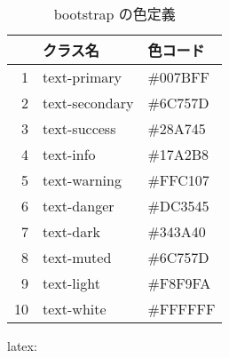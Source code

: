 \documentclass[dvipdfmx,a4j,14pt,uplatex]{jsarticle}
\begin{document}
\begin{table}[htbp]
\caption{\label{tab:org3278755}
bootstrap の色定義}
\centering
\begin{tabular}{rll}
\hline
 & クラス名 & 色コード\\
\hline
1 & text-primary & \#007BFF\\
2 & text-secondary & \#6C757D\\
3 & text-success & \#28A745\\
4 & text-info & \#17A2B8\\
5 & text-warning & \#FFC107\\
6 & text-danger & \#DC3545\\
7 & text-dark & \#343A40\\
8 & text-muted & \#6C757D\\
9 & text-light & \#F8F9FA\\
10 & text-white & \#FFFFFF\\
\hline
\end{tabular}
\end{table}

\begin{programlist}[label={nil}]{latex}{: }%

\end{programlist}
\end{document}
